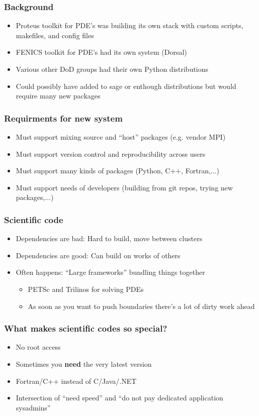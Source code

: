 \documentclass[sans,mathserif]{beamer}
\begin{document}
\begin{frame}
\frametitle{Background}
\begin{itemize}
\item Proteus toolkit for PDE's was building its own stack with custom scripts, makefiles, and config files
\item FENICS  toolkit  for PDE's had its own system (Dorsal)
\item Various other DoD groups had their own Python distributions
\item Could possibly have added  to sage or enthough distributions but would require many new packages
\end{itemize}
\end{frame}

\begin{frame}
\frametitle{Requirments for new system}
\begin{itemize}
\item Must support mixing source and ``host'' packages (e.g. vendor MPI)
\item Must support version control and reproducibility across  users
\item Must support many kinds of packages (Python, C++, Fortran,...)
\item Must support needs of developers (building from git repos, trying new packages,...)
\end{itemize}
\end{frame}

\begin{frame}
  \frametitle{Scientific code}
  \begin{itemize}
  \item<+-> Dependencies are bad: Hard to build, move between clusters
  \item<+-> Dependencies are good: Can build on works of others
  \item<+-> Often happens: ``Large frameworks'' bundling things together
    \begin{itemize}
    \item<+-> PETSc and Trilinos for solving PDEs
    \item<+-> As soon as you want to push boundaries there's a lot of dirty work ahead
    \end{itemize}
  \end{itemize}
\end{frame}

\begin{frame}[fragile]
  \frametitle{What makes scientific codes so special?}

  \begin{itemize}
    \item<+-> No root access
    \item<+-> Sometimes you {\bf need} the very latest version
    \item<+-> Fortran/C++ instead of C/Java/.NET
    \item<+-> Intersection of ``need speed'' and ``do not pay dedicated application sysadmins''
  \end{itemize}
\end{frame}
\end{document}
